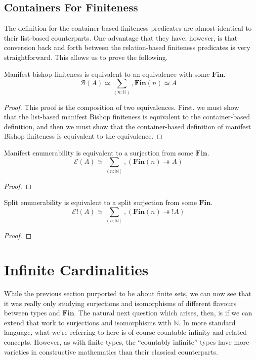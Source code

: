 \subsection{Containers For Finiteness}
The definition for the container-based finiteness predicates are almost
identical to their list-based counterparts.
One advantage that they have, however, is that conversion back and forth between
the relation-based finiteness predicates is very straightforward.
This allows us to prove the following.
\begin{theorem}
  Manifest bishop finiteness is equivalent to an equivalence with some \(\mathbf{Fin}\).
  \begin{equation}
    \mathcal{B}(A) \simeq \sum_{(n : \mathbb{N})} , \mathbf{Fin}(n) \simeq A
  \end{equation}
\end{theorem}
\begin{proof}
  This proof is the composition of two equivalences.
  First, we must show that the list-based manifest Bishop finiteness is
  equivalent to the container-based definition, and then we must show that the
  container-based definition of manifest Bishop finiteness is equivalent to the
  equivalence.
\end{proof}

\begin{lemma}
  Manifest enumerability is equivalent to a surjection from some \(\mathbf{Fin}\).
  \begin{equation}
    \mathcal{E}(A) \simeq \sum_{(n : \mathbb{N})} , \left(  \mathbf{Fin}(n) \twoheadrightarrow A \right)
  \end{equation}
\end{lemma}
\begin{proof}
\end{proof}

\begin{lemma}
  Split enumerability is equivalent to a split surjection from some \(\mathbf{Fin}\).
  \begin{equation}
    \mathcal{E}!(A) \simeq \sum_{(n : \mathbb{N})} , \left(  \mathbf{Fin}(n) \twoheadrightarrow ! A \right)
  \end{equation}
\end{lemma}
\begin{proof}
\end{proof}

\section{Infinite Cardinalities} \label{infinite-cardinalities}
While the previous section purported to be about finite sets, we can now see
that it was really only studying surjections and isomorphisms of different
flavours between types and \(\mathbf{Fin}\).
The natural next question which arises, then, is if we can extend that work to
surjections and isomorphisms with \(\mathbb{N}\).
In more standard language, what we're referring to here is of course
countable infinity and related concepts.
However, as with finite types, the ``countably infinite'' types have more
varieties in constructive mathematics than their classical counterparts.
